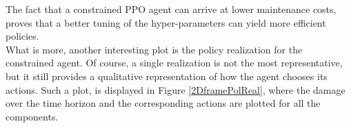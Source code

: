 \begin{table}[H]
    \centering
    \caption{Benchmark and \gls{DRL} performance on the Case Study}
    \label{costsCase}
\end{table}

The fact that a constrained \gls{PPO} agent can arrive at lower maintenance costs, proves that a better tuning of the hyper-parameters can yield more efficient policies. \\

What is more, another interesting plot is the policy realization for the constrained agent. Of course, a single realization is not the most representative, but it still provides a qualitative representation of how the agent chooses its actions. Such a plot, is displayed in Figure \ref{2DframePolReal}, where the damage over the time horizon and the corresponding actions are plotted for all the components.


